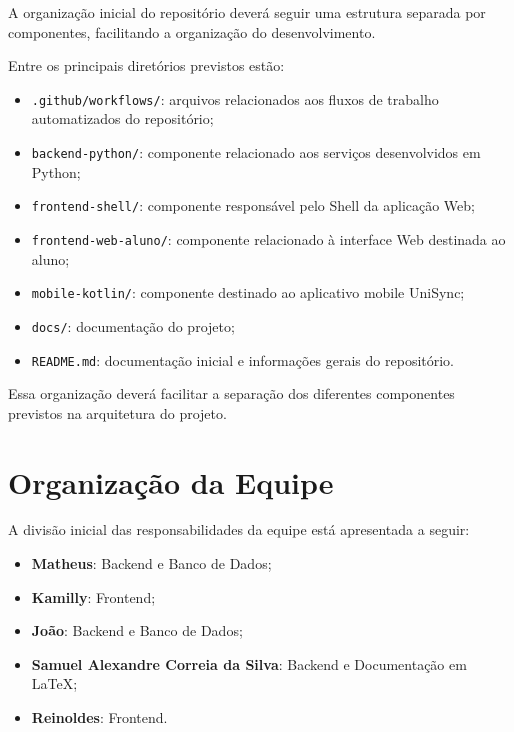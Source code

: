 \documentclass[12pt,oneside,a4paper,chapter=TITLE]{abntex2}
\begin{document}
A organização inicial do repositório deverá seguir uma estrutura
separada por componentes, facilitando a organização do desenvolvimento.

Entre os principais diretórios previstos estão:

\begin{itemize}
    \item \texttt{.github/workflows/}: arquivos relacionados aos
    fluxos de trabalho automatizados do repositório;

    \item \texttt{backend-python/}: componente relacionado aos serviços
    desenvolvidos em Python;

    \item \texttt{frontend-shell/}: componente responsável pelo Shell
    da aplicação Web;

    \item \texttt{frontend-web-aluno/}: componente relacionado à
    interface Web destinada ao aluno;

    \item \texttt{mobile-kotlin/}: componente destinado ao aplicativo
    mobile UniSync;

    \item \texttt{docs/}: documentação do projeto;

    \item \texttt{README.md}: documentação inicial e informações
    gerais do repositório.
\end{itemize}

Essa organização deverá facilitar a separação dos diferentes
componentes previstos na arquitetura do projeto.

\chapter{Organização da Equipe}

A divisão inicial das responsabilidades da equipe está apresentada a
seguir:

\begin{itemize}
    \item \textbf{Matheus}: Backend e Banco de Dados;

    \item \textbf{Kamilly}: Frontend;

    \item \textbf{João}: Backend e Banco de Dados;

    \item \textbf{Samuel Alexandre Correia da Silva}: Backend e
    Documentação em LaTeX;

    \item \textbf{Reinoldes}: Frontend.
\end{itemize}
\end{document}
